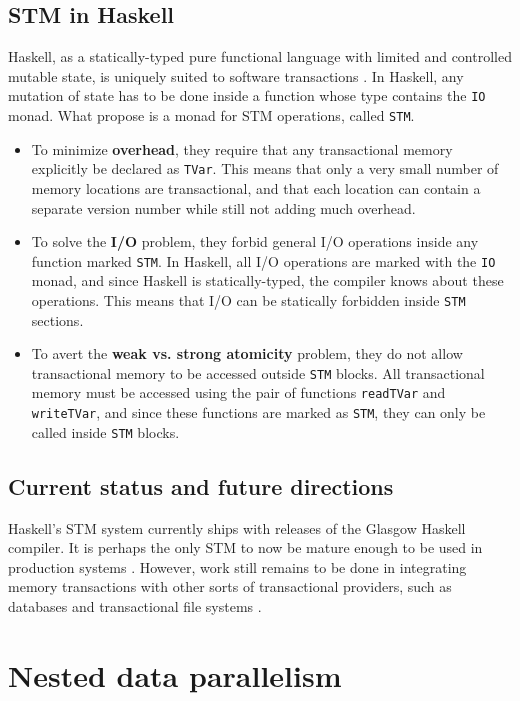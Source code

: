 \documentclass[a4paper]{acmtrans2m}
\begin{document}
\subsection{STM in Haskell}

Haskell, as a statically-typed pure functional language with limited and
controlled mutable state, is uniquely suited to software transactions
\cite{Harris:2005}. In Haskell, any mutation of state has to be done inside a
function whose type contains the \texttt{IO} monad. What 
propose is a monad for STM operations, called \texttt{STM}.

\begin{itemize}
\item To minimize \textbf{overhead}, they require that any transactional memory
  explicitly be declared as \texttt{TVar}. This means that only a very small
  number of memory locations are transactional, and that each location can contain
  a separate version number while still not adding much overhead.
\item To solve the \textbf{I/O} problem, they forbid general I/O operations inside
  any function marked \texttt{STM}. In Haskell, all I/O operations are marked with
  the \texttt{IO} monad, and since Haskell is statically-typed, the compiler knows
  about these operations. This means that I/O can be statically forbidden inside
  \texttt{STM} sections.
\item To avert the \textbf{weak vs. strong atomicity} problem, they do not allow
  transactional memory to be accessed outside \texttt{STM} blocks. All
  transactional memory must be accessed using the pair of functions
  \texttt{readTVar} and \texttt{writeTVar}, and since these functions are marked
  as \texttt{STM}, they can only be called inside \texttt{STM} blocks.
\end{itemize}

\subsection{Current status and future directions}

Haskell's STM system currently ships with releases of the Glasgow Haskell compiler.
It is perhaps the only STM to now be mature enough to be used in production systems
\cite{Stewart:2009}. However, work still remains to be done in integrating memory
transactions with other sorts of transactional providers, such as databases and
transactional file systems \cite{SPJ:2006}.

\section{Nested data parallelism}
\label{sec:dph}



\end{document}
